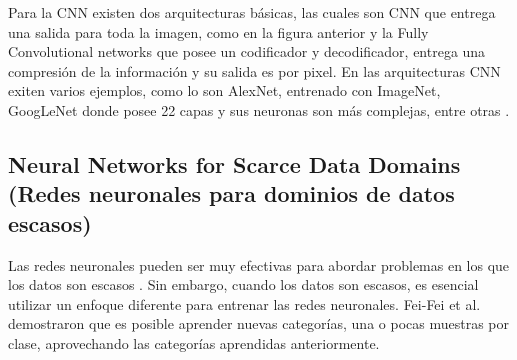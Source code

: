 \par Para la CNN existen dos arquitecturas básicas, las cuales son CNN que entrega una salida para toda la imagen, como en la figura anterior y la Fully Convolutional networks que posee un codificador y decodificador, entrega una compresión de la información y su salida es por pixel. En las arquitecturas CNN exiten varios ejemplos, como lo son AlexNet, entrenado con ImageNet, GoogLeNet donde posee 22 capas y sus neuronas son más complejas, entre otras \cite{NIPS2012_c399862d}.\\


\doublespacing
\subsection{Neural Networks for Scarce Data Domains  (Redes neuronales para dominios de datos escasos)}
Las redes neuronales pueden ser muy efectivas para abordar problemas en los que los datos son escasos \cite{Carola}. Sin embargo, cuando los datos son escasos, es esencial utilizar un enfoque diferente para entrenar las redes neuronales. Fei-Fei et al. \cite{Fei-Fei2006} demostraron que es posible aprender nuevas categorías, una o pocas muestras por clase, aprovechando las categorías aprendidas anteriormente. \\

\doublespacing
